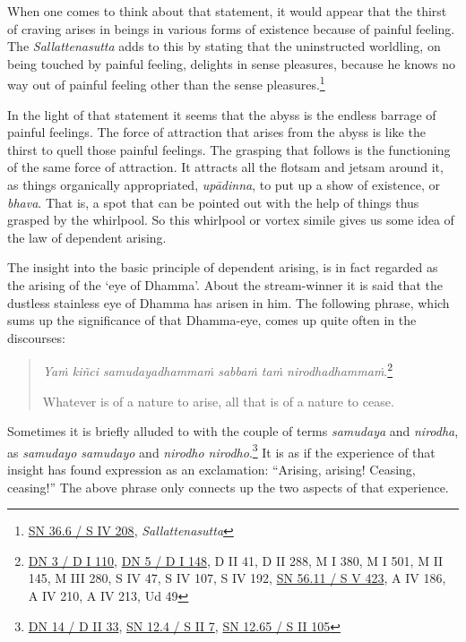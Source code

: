 When one comes to think about that statement, it would appear that the thirst of craving arises in beings in various forms of existence because of painful feeling. The \emph{Sallattenasutta} adds to this by stating that the uninstructed worldling, on being touched by painful feeling, delights in sense pleasures, because he knows no way out of painful feeling other than the sense pleasures.\footnote{\href{https://suttacentral.net/sn36.6/pli/ms}{SN 36.6 / S IV 208}, \emph{Sallattenasutta}}

In the light of that statement it seems that the abyss is the endless barrage of painful feelings. The force of attraction that arises from the abyss is like the thirst to quell those painful feelings. The grasping that follows is the functioning of the same force of attraction. It attracts all the flotsam and jetsam around it, as things organically appropriated, \emph{upādinna}, to put up a show of existence, or \emph{bhava}. That is, a spot that can be pointed out with the help of things thus grasped by the whirlpool. So this whirlpool or vortex simile gives us some idea of the law of dependent arising.

The insight into the basic principle of dependent arising, is in fact regarded as the arising of the `eye of Dhamma'. About the stream-winner it is said that the dustless stainless eye of Dhamma has arisen in him. The following phrase, which sums up the significance of that Dhamma-eye, comes up quite often in the discourses:

\begin{quote}
\emph{Yaṁ kiñci samudayadhammaṁ sabbaṁ taṁ nirodhadhammaṁ}.\footnote{\href{https://suttacentral.net/dn3/pli/ms}{DN 3 / D I 110}, \href{https://suttacentral.net/dn5/pli/ms}{DN 5 / D I 148}, D II 41, D II 288, M I 380, M I 501, M II 145, M III 280, S IV 47, S IV 107, S IV 192, \href{https://suttacentral.net/sn56.11/pli/ms}{SN 56.11 / S V 423}, A IV 186, A IV 210, A IV 213, Ud 49}

Whatever is of a nature to arise, all that is of a nature to cease.
\end{quote}

Sometimes it is briefly alluded to with the couple of terms \emph{samudaya} and \emph{nirodha}, as \emph{samudayo samudayo} and \emph{nirodho nirodho}.\footnote{\href{https://suttacentral.net/dn14/pli/ms}{DN 14 / D II 33}, \href{https://suttacentral.net/sn12.4/pli/ms}{SN 12.4 / S II 7}, \href{https://suttacentral.net/sn12.65/pli/ms}{SN 12.65 / S II 105}} It is as if the experience of that insight has found expression as an exclamation: ``Arising, arising! Ceasing, ceasing!'' The above phrase only connects up the two aspects of that experience.

